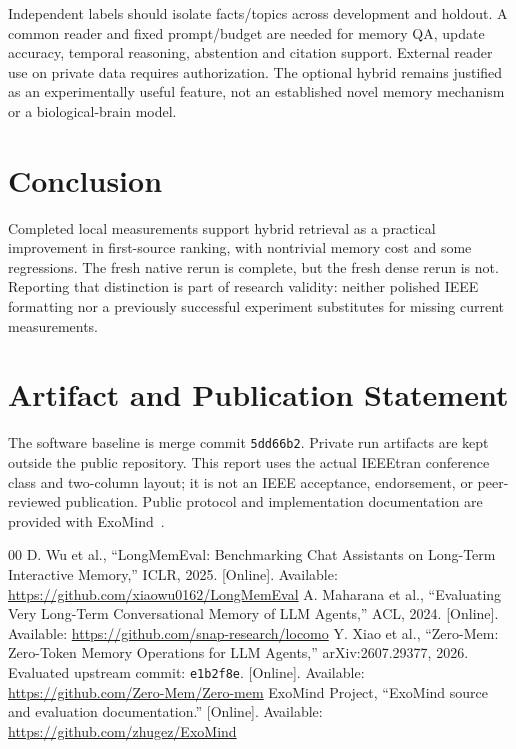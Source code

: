 \documentclass[conference]{IEEEtran}
\begin{document}
Independent labels should isolate facts/topics across development and holdout. A common reader and fixed prompt/budget are needed for memory QA, update accuracy, temporal reasoning, abstention and citation support. External reader use on private data requires authorization. The optional hybrid remains justified as an experimentally useful feature, not an established novel memory mechanism or a biological-brain model.

\section{Conclusion}
Completed local measurements support hybrid retrieval as a practical improvement in first-source ranking, with nontrivial memory cost and some regressions. The fresh native rerun is complete, but the fresh dense rerun is not. Reporting that distinction is part of research validity: neither polished IEEE formatting nor a previously successful experiment substitutes for missing current measurements.

\section*{Artifact and Publication Statement}
The software baseline is merge commit \texttt{5dd66b2}. Private run artifacts are kept outside the public repository. This report uses the actual IEEEtran conference class and two-column layout; it is not an IEEE acceptance, endorsement, or peer-reviewed publication. Public protocol and implementation documentation are provided with ExoMind~\cite{exom}.

\begin{thebibliography}{00}
 D. Wu et al., ``LongMemEval: Benchmarking Chat Assistants on Long-Term Interactive Memory,'' ICLR, 2025. [Online]. Available: \url{https://github.com/xiaowu0162/LongMemEval}
 A. Maharana et al., ``Evaluating Very Long-Term Conversational Memory of LLM Agents,'' ACL, 2024. [Online]. Available: \url{https://github.com/snap-research/locomo}
 Y. Xiao et al., ``Zero-Mem: Zero-Token Memory Operations for LLM Agents,'' arXiv:2607.29377, 2026. Evaluated upstream commit: \texttt{e1b2f8e}. [Online]. Available: \url{https://github.com/Zero-Mem/Zero-mem}
 ExoMind Project, ``ExoMind source and evaluation documentation.'' [Online]. Available: \url{https://github.com/zhugez/ExoMind}
\end{thebibliography}
\end{document}

